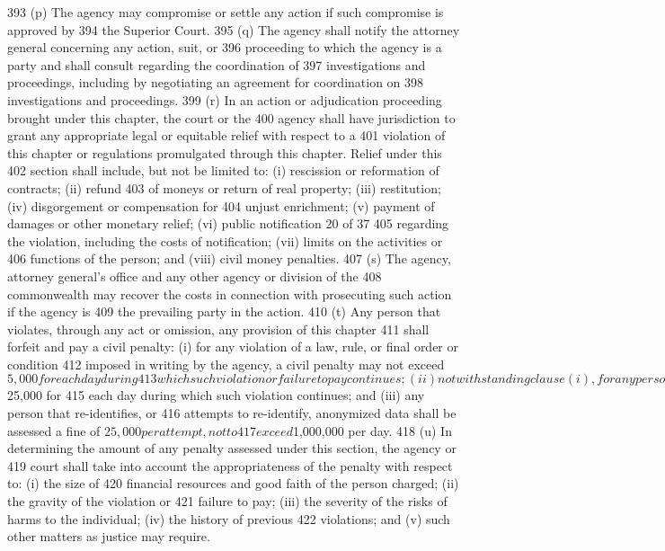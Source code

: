 393 (p) The agency may compromise or settle any action if such compromise is approved by
394 the Superior Court.
395 (q) The agency shall notify the attorney general concerning any action, suit, or
396 proceeding to which the agency is a party and shall consult regarding the coordination of
397 investigations and proceedings, including by negotiating an agreement for coordination on
398 investigations and proceedings.
399 (r) In an action or adjudication proceeding brought under this chapter, the court or the
400 agency shall have jurisdiction to grant any appropriate legal or equitable relief with respect to a
401 violation of this chapter or regulations promulgated through this chapter. Relief under this
402 section shall include, but not be limited to: (i) rescission or reformation of contracts; (ii) refund
403 of moneys or return of real property; (iii) restitution; (iv) disgorgement or compensation for
404 unjust enrichment; (v) payment of damages or other monetary relief; (vi) public notification
20 of 37
405 regarding the violation, including the costs of notification; (vii) limits on the activities or
406 functions of the person; and (viii) civil money penalties.
407 (s) The agency, attorney general’s office and any other agency or division of the
408 commonwealth may recover the costs in connection with prosecuting such action if the agency is
409 the prevailing party in the action.
410 (t) Any person that violates, through any act or omission, any provision of this chapter
411 shall forfeit and pay a civil penalty: (i) for any violation of a law, rule, or final order or condition
412 imposed in writing by the agency, a civil penalty may not exceed $5,000 for each day during
413 which such violation or failure to pay continues; (ii) not withstanding clause (i), for any person
414 that recklessly engages in a violation of this chapter, a civil penalty may not exceed $25,000 for
415 each day during which such violation continues; and (iii) any person that re-identifies, or
416 attempts to re-identify, anonymized data shall be assessed a fine of $25,000 per attempt, not to
417 exceed $1,000,000 per day.
418 (u) In determining the amount of any penalty assessed under this section, the agency or
419 court shall take into account the appropriateness of the penalty with respect to: (i) the size of
420 financial resources and good faith of the person charged; (ii) the gravity of the violation or
421 failure to pay; (iii) the severity of the risks of harms to the individual; (iv) the history of previous
422 violations; and (v) such other matters as justice may require.
